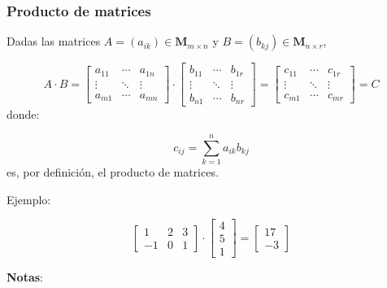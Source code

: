 \subsubsection{Producto de matrices}

Dadas las matrices $A = (a_{ik}) \in \mathbf{M}_{m\times n}$ y $B = (b_{kj}) \in \mathbf{M}_{n\times r}$,

\begin{equation}
	A \cdot B = 
	\begin{bmatrix}
		a_{11} & \cdots & a_{1n}\\
		\vdots & \ddots & \vdots\\
		a_{m1} & \cdots & a_{mn}
	\end{bmatrix} \cdot \begin{bmatrix}
		b_{11} & \cdots & b_{1r}\\
		\vdots & \ddots & \vdots\\
		b_{n1} & \cdots & b_{nr}
	\end{bmatrix} = \begin{bmatrix}
		c_{11} & \cdots & c_{1r}\\
		\vdots & \ddots & \vdots\\
		c_{m1} & \cdots & c_{mr}
	\end{bmatrix} = C
\end{equation}
donde:

\begin{equation}
	c_{ij} = \sum_{k=1}^{n} a_{ik} b_{kj}
	\label{eq:cij}
\end{equation}
es, por definición, el producto de matrices.

Ejemplo:

\[ \begin{bmatrix}
	1 & 2 & 3\\
	-1 & 0 & 1
\end{bmatrix} \cdot \begin{bmatrix}
	4 \\ 5 \\ 1
\end{bmatrix} = \begin{bmatrix}
	17 \\ -3
\end{bmatrix} \]

\textbf{Notas}:

